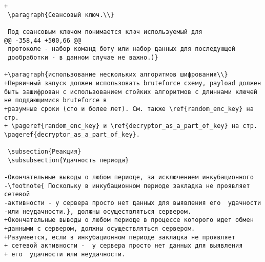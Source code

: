 \begin{verbatim}
+
 \paragraph{Сеансовый ключ.\\}

 Под сеансовым ключом понимается ключ используемый для
@@ -358,44 +500,66 @@
 протоколе - набор команд боту или набор данных для последующей
 дообработки - в данном случае не важно.)}

+\paragraph{использование нескольких алгоритмов шифрования\\}
+Первичный запуск должен использовать bruteforce схему, payload должен быть зашифрован с использованием стойких алгоритмов с длиннами ключей не поддающимися bruteforce в
+разумные сроки (сто и более лет). См. также \ref{random_enc_key} на стр.
+ \pageref{random_enc_key} и \ref{decryptor_as_a_part_of_key} на стр. \pageref{decryptor_as_a_part_of_key}.

 \subsection{Реакция}
 \subsubsection{Удачность периода}

-Окончательные выводы о любом периоде, за исключением инкубационного
-\footnote{ Поскольку в инкубационном периоде закладка не проявляет сетевой
-активности - у сервера просто нет данных для выявления его  удачности
-или неудачности.}, должны осуществляться сервером.
+Окончательные выводы о любом периоде в процессе которого идет обмен
+данными с сервером, должны осуществляться сервером.
+Разумеется, если в инкубационном периоде закладка не проявляет
+ сетевой активности -  у сервера просто нет данных для выявления
+ его  удачности или неудачности.


\end{verbatim}
